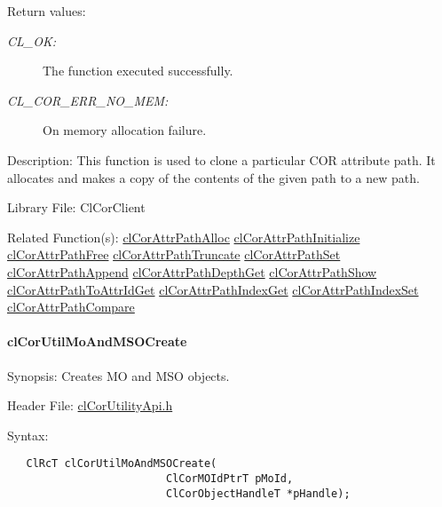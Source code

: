 \begin{Desc}
\item[Return values:]
\begin{description}
\item[{\em CL\_\-OK:}]The function executed successfully. \item[{\em CL\_\-COR\_\-ERR\_\-NO\_\-MEM:}]On memory allocation failure.\end{description}
\end{Desc}
\begin{Desc}
\item[Description:]This function is used to clone a particular COR attribute path. It allocates and makes a copy of the contents of the given path to a new path.\end{Desc}
\begin{Desc}
\item[Library File:]Cl\-Cor\-Client\end{Desc}
\begin{Desc}
\item[Related Function(s):]\hyperlink{group__group13}{cl\-Cor\-Attr\-Path\-Alloc} \hyperlink{group__group13}{cl\-Cor\-Attr\-Path\-Initialize} \hyperlink{group__group13}{cl\-Cor\-Attr\-Path\-Free} \hyperlink{group__group13}{cl\-Cor\-Attr\-Path\-Truncate} \hyperlink{group__group13}{cl\-Cor\-Attr\-Path\-Set} \hyperlink{group__group13}{cl\-Cor\-Attr\-Path\-Append} \hyperlink{group__group13}{cl\-Cor\-Attr\-Path\-Depth\-Get} \hyperlink{group__group13}{cl\-Cor\-Attr\-Path\-Show} \hyperlink{group__group13}{cl\-Cor\-Attr\-Path\-To\-Attr\-Id\-Get} \hyperlink{group__group13}{cl\-Cor\-Attr\-Path\-Index\-Get} \hyperlink{group__group13}{cl\-Cor\-Attr\-Path\-Index\-Set} \hyperlink{group__group13}{cl\-Cor\-Attr\-Path\-Compare} \end{Desc}
\hypertarget{pagecor270}{}\paragraph{cl\-Cor\-Util\-Mo\-And\-MSOCreate}\label{pagecor270}
\begin{Desc}
\item[Synopsis:]Creates MO and MSO objects.\end{Desc}
\begin{Desc}
\item[Header File:]\hyperlink{cl_cor_utility_api_8h}{cl\-Cor\-Utility\-Api.h}\end{Desc}
\begin{Desc}
\item[Syntax:]

\footnotesize\begin{verbatim}   ClRcT clCorUtilMoAndMSOCreate(
                         ClCorMOIdPtrT pMoId,
                         ClCorObjectHandleT *pHandle);
\end{verbatim}
\normalsize
\end{Desc}
